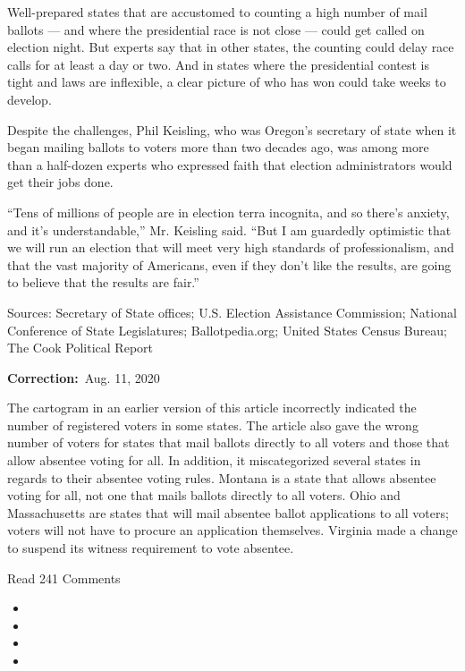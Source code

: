 Well-prepared states that are accustomed to counting a high number of
mail ballots --- and where the presidential race is not close --- could
get called on election night. But experts say that in other states, the
counting could delay race calls for at least a day or two. And in states
where the presidential contest is tight and laws are inflexible, a clear
picture of who has won could take weeks to develop.

Despite the challenges, Phil Keisling, who was Oregon's secretary of
state when it began mailing ballots to voters more than two decades ago,
was among more than a half-dozen experts who expressed faith that
election administrators would get their jobs done.

``Tens of millions of people are in election terra incognita, and so
there's anxiety, and it's understandable,'' Mr. Keisling said. ``But I
am guardedly optimistic that we will run an election that will meet very
high standards of professionalism, and that the vast majority of
Americans, even if they don't like the results, are going to believe
that the results are fair.''

Sources: Secretary of State offices; U.S. Election Assistance
Commission; National Conference of State Legislatures; Ballotpedia.org;
United States Census Bureau; The Cook Political Report

\textbf{Correction:}~Aug. 11, 2020

The cartogram in an earlier version of this article incorrectly
indicated the number of registered voters in some states. The article
also gave the wrong number of voters for states that mail ballots
directly to all voters and those that allow absentee voting for all. In
addition, it miscategorized several states in regards to their absentee
voting rules. Montana is a state that allows absentee voting for all,
not one that mails ballots directly to all voters. Ohio and
Massachusetts are states that will mail absentee ballot applications to
all voters; voters will not have to procure an application themselves.
Virginia made a change to suspend its witness requirement to vote
absentee.

Read 241 Comments

\begin{itemize}
\item
\item
\item
\item
\end{itemize}

